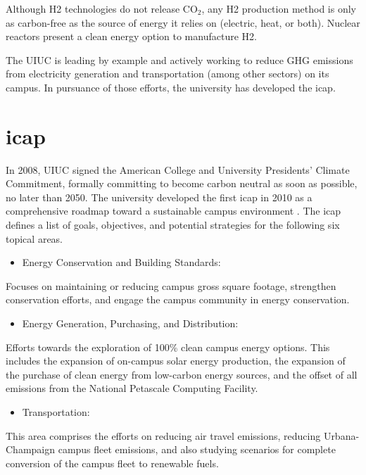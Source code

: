 \documentclass[11pt,letterpaper]{article}
\begin{document}
Although \gls{H2} technologies do not release CO$_2$, any \gls{H2} production method is only as carbon-free as the source of energy it relies on (electric, heat, or both).
Nuclear reactors present a clean energy option to manufacture \gls{H2}.

The \gls{UIUC} is leading by example and actively working to reduce \gls{GHG} emissions from electricity generation and transportation (among other sectors) on its campus.
In pursuance of those efforts, the university has developed the \gls{icap}.

\section{\gls{icap}}
In 2008, \gls{UIUC} signed the American College and University Presidents' Climate Commitment, formally committing to become carbon neutral as soon as possible, no later than 2050.
The university developed the first \gls{icap} in 2010 as a comprehensive roadmap toward a sustainable campus environment \cite{university_of_illinois_at_urbana-champaign_illlinois_2015}.
The \gls{icap} defines a list of goals, objectives, and potential strategies for the following six topical areas.

\begin{itemize}
	\item Energy Conservation and Building Standards:
\end{itemize}
Focuses on maintaining or reducing campus gross square footage, strengthen conservation efforts, and engage the campus community in energy conservation.

\begin{itemize}
	\item Energy Generation, Purchasing, and Distribution:
\end{itemize}
Efforts towards the exploration of 100\% clean campus energy options.
This includes the expansion of on-campus solar energy production, the expansion of the purchase of clean energy from low-carbon energy sources, and the offset of all emissions from the National Petascale Computing Facility.

\begin{itemize}
	\item Transportation:
\end{itemize}
This area comprises the efforts on reducing air travel emissions, reducing Urbana-Champaign campus fleet emissions, and also studying scenarios for complete conversion of the campus fleet to renewable fuels.
\end{document}
